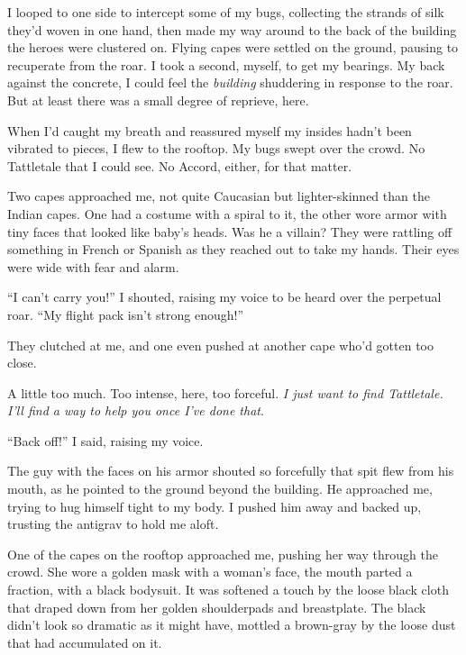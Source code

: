 I looped to one side to intercept some of my bugs, collecting the strands of silk they'd woven in one hand, then made my way around to the back of the building the heroes were clustered on.  Flying capes were settled on the ground, pausing to recuperate from the roar.  I took a second, myself, to get my bearings.  My back against the concrete, I could feel the \emph{building} shuddering in response to the roar.  But at least there was a small degree of reprieve, here.



When I'd caught my breath and reassured myself my insides hadn't been vibrated to pieces, I flew to the rooftop.  My bugs swept over the crowd.  No Tattletale that I could see.  No Accord, either, for that matter.



Two capes approached me, not quite Caucasian but lighter-skinned than the Indian capes.  One had a costume with a spiral to it, the other wore armor with tiny faces that looked like baby's heads.  Was he a villain?  They were rattling off something in French or Spanish as they reached out to take my hands.  Their eyes were wide with fear and alarm.



``I can't carry you!'' I shouted, raising my voice to be heard over the perpetual roar.  ``My flight pack isn't strong enough!''



They clutched at me, and one even pushed at another cape who'd gotten too close.



A little too much.  Too intense, here, too forceful.  \emph{I just want to find Tattletale.  I'll find a way to help you once I've done that}.



``Back off!'' I said, raising my voice.



The guy with the faces on his armor shouted so forcefully that spit flew from his mouth, as he pointed to the ground beyond the building.  He approached me, trying to hug himself tight to my body.  I pushed him away and backed up, trusting the antigrav to hold me aloft.



One of the capes on the rooftop approached me, pushing her way through the crowd.  She wore a golden mask with a woman's face, the mouth parted a fraction, with a black bodysuit.  It was softened a touch by the loose black cloth that draped down from her golden shoulderpads and breastplate.  The black didn't look so dramatic as it might have, mottled a brown-gray by the loose dust that had accumulated on it.



